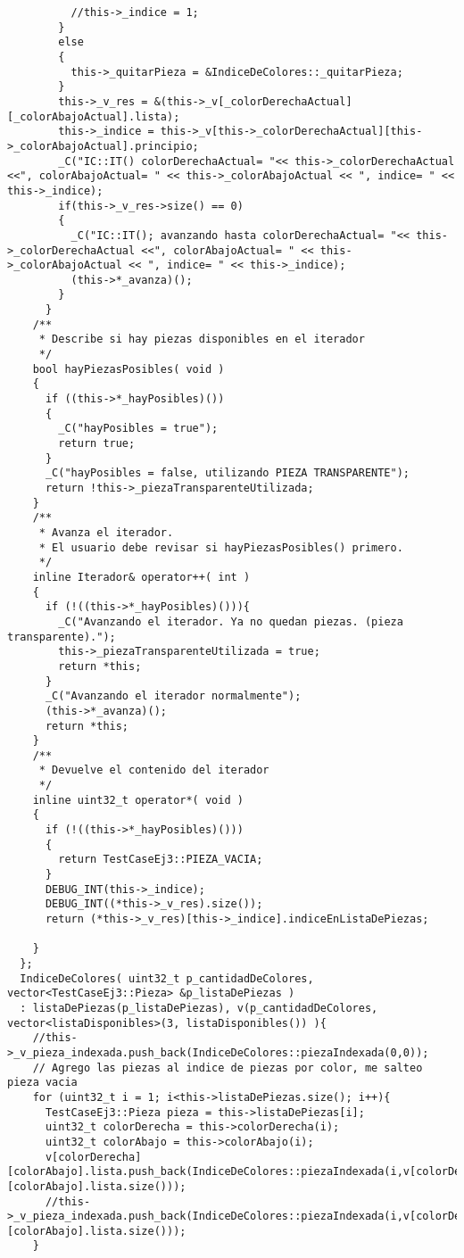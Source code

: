 \documentclass[11pt, a4paper, twoside]{article}
\begin{document}
\begin{lstlisting}
          //this->_indice = 1;
        }
        else
        {
          this->_quitarPieza = &IndiceDeColores::_quitarPieza;
        }
        this->_v_res = &(this->_v[_colorDerechaActual][_colorAbajoActual].lista);
        this->_indice = this->_v[this->_colorDerechaActual][this->_colorAbajoActual].principio;
        _C("IC::IT() colorDerechaActual= "<< this->_colorDerechaActual <<", colorAbajoActual= " << this->_colorAbajoActual << ", indice= " << this->_indice);
        if(this->_v_res->size() == 0)
        {
          _C("IC::IT(); avanzando hasta colorDerechaActual= "<< this->_colorDerechaActual <<", colorAbajoActual= " << this->_colorAbajoActual << ", indice= " << this->_indice);
          (this->*_avanza)();
        }
      }
    /**
     * Describe si hay piezas disponibles en el iterador
     */
    bool hayPiezasPosibles( void )
    {
      if ((this->*_hayPosibles)())
      {
        _C("hayPosibles = true");
        return true;
      }
      _C("hayPosibles = false, utilizando PIEZA TRANSPARENTE");
      return !this->_piezaTransparenteUtilizada;
    }
    /**
     * Avanza el iterador.
     * El usuario debe revisar si hayPiezasPosibles() primero.
     */
    inline Iterador& operator++( int )
    {
      if (!((this->*_hayPosibles)())){
        _C("Avanzando el iterador. Ya no quedan piezas. (pieza transparente).");
        this->_piezaTransparenteUtilizada = true;
        return *this;
      }
      _C("Avanzando el iterador normalmente");
      (this->*_avanza)();
      return *this;
    }
    /**
     * Devuelve el contenido del iterador
     */
    inline uint32_t operator*( void ) 
    {
      if (!((this->*_hayPosibles)()))
      {
        return TestCaseEj3::PIEZA_VACIA;
      }
      DEBUG_INT(this->_indice);
      DEBUG_INT((*this->_v_res).size());
      return (*this->_v_res)[this->_indice].indiceEnListaDePiezas;

    }
  };
  IndiceDeColores( uint32_t p_cantidadDeColores, vector<TestCaseEj3::Pieza> &p_listaDePiezas ) 
  : listaDePiezas(p_listaDePiezas), v(p_cantidadDeColores, vector<listaDisponibles>(3, listaDisponibles()) ){
    //this->_v_pieza_indexada.push_back(IndiceDeColores::piezaIndexada(0,0));
    // Agrego las piezas al indice de piezas por color, me salteo pieza vacia
    for (uint32_t i = 1; i<this->listaDePiezas.size(); i++){
      TestCaseEj3::Pieza pieza = this->listaDePiezas[i];
      uint32_t colorDerecha = this->colorDerecha(i);
      uint32_t colorAbajo = this->colorAbajo(i);
      v[colorDerecha][colorAbajo].lista.push_back(IndiceDeColores::piezaIndexada(i,v[colorDerecha][colorAbajo].lista.size()));
      //this->_v_pieza_indexada.push_back(IndiceDeColores::piezaIndexada(i,v[colorDerecha][colorAbajo].lista.size()));
    }
   

\end{lstlisting}
\end{document}
